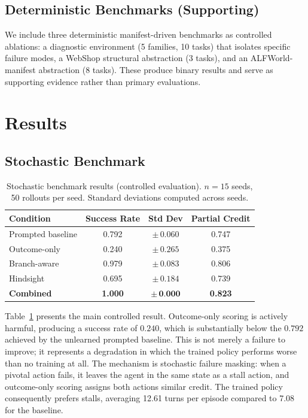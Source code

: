 \documentclass[11pt]{article}
\begin{document}
\subsection{Deterministic Benchmarks (Supporting)}
We include three deterministic manifest-driven benchmarks as controlled ablations: a diagnostic environment (5 families, 10 tasks) that isolates specific failure modes, a WebShop \citep{yao2022webshop} structural abstraction (3 tasks), and an ALFWorld-manifest abstraction (8 tasks). These produce binary results and serve as supporting evidence rather than primary evaluations.

\section{Results}

\subsection{Stochastic Benchmark}

\begin{table}[t]
\centering
\caption{Stochastic benchmark results (controlled evaluation). $n{=}15$ seeds, 50 rollouts per seed. Standard deviations computed across seeds.}
\label{tab:stochastic}
\begin{tabular}{lccc}
\toprule
Condition & Success Rate & Std Dev & Partial Credit \\
\midrule
Prompted baseline & 0.792 & $\pm\,0.060$ & 0.747 \\
Outcome-only & 0.240 & $\pm\,0.265$ & 0.375 \\
Branch-aware & 0.979 & $\pm\,0.083$ & 0.806 \\
Hindsight & 0.695 & $\pm\,0.184$ & 0.739 \\
\textbf{Combined} & \textbf{1.000} & $\pm\,\textbf{0.000}$ & \textbf{0.823} \\
\bottomrule
\end{tabular}
\end{table}

Table~\ref{tab:stochastic} presents the main controlled result. Outcome-only scoring is actively harmful, producing a success rate of $0.240$, which is substantially below the $0.792$ achieved by the unlearned prompted baseline. This is not merely a failure to improve; it represents a degradation in which the trained policy performs worse than no training at all. The mechanism is stochastic failure masking: when a pivotal action fails, it leaves the agent in the same state as a stall action, and outcome-only scoring assigns both actions similar credit. The trained policy consequently prefers stalls, averaging 12.61 turns per episode compared to 7.08 for the baseline.
\end{document}
